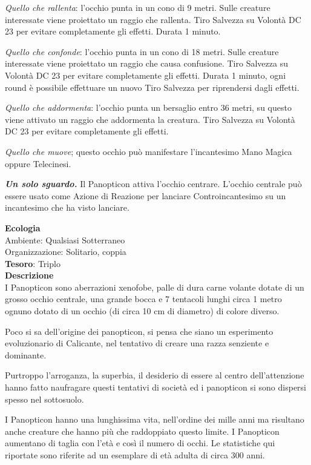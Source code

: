 \begin{multicols}{2}
	\textit{Quello che rallenta}: l'occhio punta in un cono di 9 metri. Sulle creature interessate viene proiettato un raggio che rallenta. Tiro Salvezza su Volontà DC 23 per evitare completamente gli effetti. Durata 1 minuto.

	\textit{Quello che confonde}: l'occhio punta in un cono di 18 metri. Sulle creature interessate viene proiettato un raggio che causa confusione. Tiro Salvezza su Volontà DC 23 per evitare completamente gli effetti. Durata 1 minuto, ogni round è possibile effettuare un nuovo Tiro Salvezza per riprendersi dagli effetti.

	\textit{Quello che addormenta}: l'occhio punta un bersaglio entro 36 metri, su questo viene attivato un raggio che addormenta la creatura. Tiro Salvezza su Volontà DC 23 per evitare completamente gli effetti.

	\textit{Quello che muove}; questo occhio può manifestare l'incantesimo Mano Magica oppure Telecinesi.

	\textit{\textbf{Un solo sguardo.}} Il Panopticon attiva l'occhio centrare. L'occhio centrale può essere usato come Azione di Reazione per lanciare Controincantesimo su un incantesimo che ha visto lanciare.

	\textbf{Ecologia}\\
	Ambiente: Qualsiasi Sotterraneo\\
	Organizzazione: Solitario, coppia\\
	\textbf{Tesoro}: Triplo\\
	\textbf{Descrizione}\\
	I Panopticon sono aberrazioni xenofobe, palle di dura carne volante dotate di un grosso occhio centrale, una grande bocca e 7 tentacoli lunghi circa 1 metro ognuno dotato di un occhio (di circa 10 cm di diametro) di colore diverso.

	Poco si sa dell'origine dei panopticon, si pensa che siano un esperimento evoluzionario di Calicante, nel tentativo di creare una razza senziente e dominante.

	Purtroppo l'arroganza, la superbia, il desiderio di essere al centro dell'attenzione hanno fatto naufragare questi tentativi di società ed i panopticon si sono dispersi spesso nel sottosuolo.

	I Panopticon hanno una lunghissima vita, nell'ordine dei mille anni ma risultano anche creature che hanno più che raddoppiato questo limite. I Panopticon aumentano di taglia con l'età e così il numero di occhi. Le statistiche qui riportate sono riferite ad un esemplare di età adulta di circa 300 anni.



\end{multicols}
